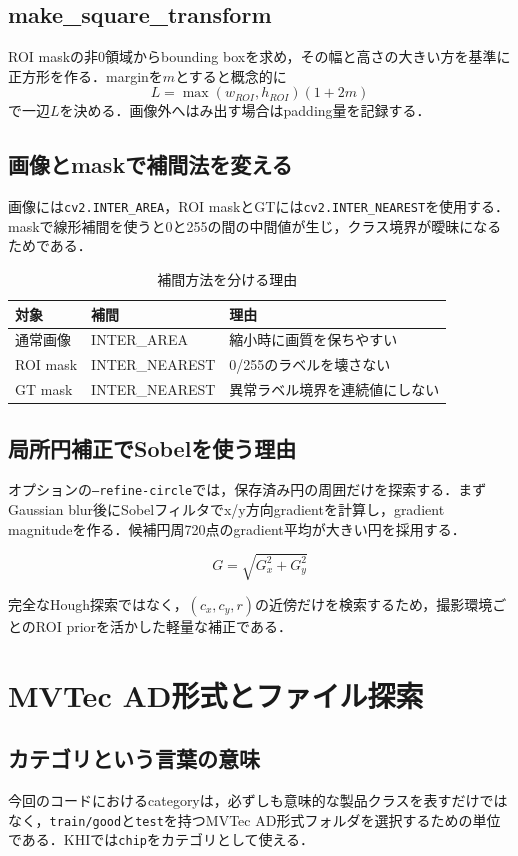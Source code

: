 \documentclass[a4paper,11pt]{ltjsreport}
\begin{document}
\section{make\_square\_transform}
ROI maskの非0領域からbounding boxを求め，その幅と高さの大きい方を基準に正方形を作る．marginを\(m\)とすると概念的に
\[
L=\max(w_{ROI},h_{ROI})(1+2m)
\]
で一辺\(L\)を決める．画像外へはみ出す場合はpadding量を記録する．

\section{画像とmaskで補間法を変える}
画像には\texttt{cv2.INTER\_AREA}，ROI maskとGTには\texttt{cv2.INTER\_NEAREST}を使用する．maskで線形補間を使うと0と255の間の中間値が生じ，クラス境界が曖昧になるためである．

\begin{table}[H]
\centering
\caption{補間方法を分ける理由}
\begin{tabularx}{\linewidth}{L{35mm} L{42mm} Y}
\toprule
対象 & 補間 & 理由 \\
\midrule
通常画像 & INTER\_AREA & 縮小時に画質を保ちやすい \\
ROI mask & INTER\_NEAREST & 0/255のラベルを壊さない \\
GT mask & INTER\_NEAREST & 異常ラベル境界を連続値にしない \\
\bottomrule
\end{tabularx}
\end{table}

\section{局所円補正でSobelを使う理由}
オプションの\texttt{--refine-circle}では，保存済み円の周囲だけを探索する．まずGaussian blur後にSobelフィルタでx/y方向gradientを計算し，gradient magnitudeを作る．候補円周720点のgradient平均が大きい円を採用する．

\[
G=\sqrt{G_x^2+G_y^2}
\]

完全なHough探索ではなく，\((c_x,c_y,r)\)の近傍だけを検索するため，撮影環境ごとのROI priorを活かした軽量な補正である．

\chapter{MVTec AD形式とファイル探索}

\section{カテゴリという言葉の意味}
今回のコードにおけるcategoryは，必ずしも意味的な製品クラスを表すだけではなく，\texttt{train/good}と\texttt{test}を持つMVTec AD形式フォルダを選択するための単位である．KHIでは\texttt{chip}をカテゴリとして使える．
\end{document}
